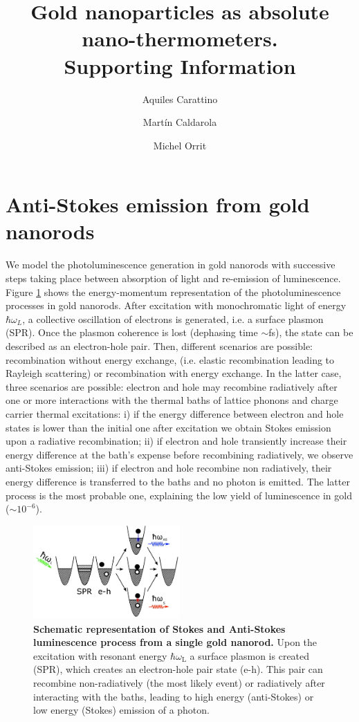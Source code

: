 \documentclass[journal=nalefd,manuscript=letter]{achemso}
\author{Aquiles Carattino}
\affiliation[Leiden]
{Huygens-Kamerlingh Onnes Lab, 2300RA Leiden, The Netherlands}
\author{Mart\'in Caldarola}
\affiliation[Leiden]
{Huygens-Kamerlingh Onnes Lab, 2300RA Leiden, The Netherlands}
\author{Michel Orrit}
\affiliation[Leiden]
{Huygens-Kamerlingh Onnes Lab, 2300RA Leiden, The Netherlands}
\title{Gold nanoparticles as absolute nano-thermometers. \\
Supporting Information}
\begin{document}
\maketitle


\section{Anti-Stokes emission from gold nanorods}\label{sec:AS}

We model the photoluminescence generation in gold nanorods with successive 
steps taking place between absorption of light and re-emission of luminescence\cite{Carattino2016a}. 
Figure \ref{fig:anti-Stokes-process} shows the energy-momentum representation
of the photoluminescence processes in gold nanorods. 
After excitation with monochromatic light of energy $\hbar \omega_L$, 
a collective oscillation of electrons is generated, i.e. a surface plasmon (SPR). 
Once the plasmon coherence is lost (dephasing time $\sim$fs), the state can be described as an
electron-hole pair. Then, different scenarios are possible: recombination 
without energy exchange, (i.e. elastic recombination leading to Rayleigh scattering) or 
recombination with energy exchange. In the latter case, three scenarios are possible: electron and hole may
recombine radiatively after one or more interactions with the thermal baths of
lattice phonons and charge carrier thermal excitations: i) if the energy
difference between electron and hole states is lower than the initial one after
excitation we obtain Stokes emission upon a radiative recombination; ii) if
electron and hole transiently increase their energy difference at the bath's
expense before recombining radiatively, we observe anti-Stokes emission; iii) if
electron and hole recombine non radiatively, their energy difference is
transferred to the baths and no photon is emitted. The latter process is the
most probable one, explaining the low yield of luminescence in gold ($\sim 10^{-6}$). 

\begin{figure}[htp] \centering
\includegraphics[width=0.5\textwidth]{Figures/Supplementary/01_AS_Scheme/luminescence_all_AS.png}
\caption{\textbf{Schematic representation of Stokes and Anti-Stokes luminescence process from a single gold nanorod.} 
Upon the excitation with resonant energy $\hbar \omega_\textrm{L}$ a surface plasmon is created (SPR), which creates 
an electron-hole pair state (e-h). This pair can recombine non-radiatively (the most likely event) or radiatively
after interacting with the baths, leading to high energy (anti-Stokes) or low energy (Stokes) emission of a photon.}
	\label{fig:anti-Stokes-process}
\end{figure}
\end{document}
